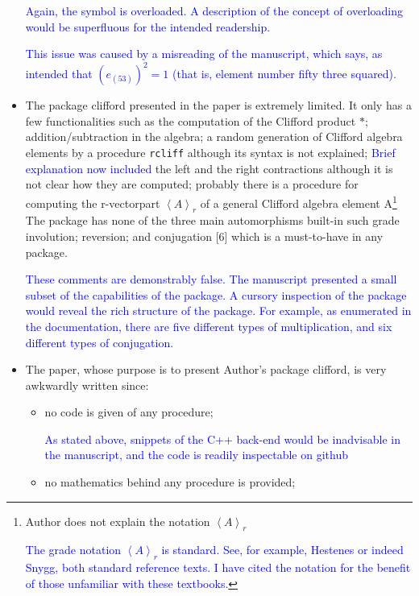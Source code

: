 \documentclass{article}
\begin{document}
\begin{itemize}
{\textcolor{blue}{Again, the {\tt *} symbol is overloaded.  A
  description of the concept of overloading would be superfluous for
  the intended readership.}  }

\textcolor{blue}{This issue was caused by a misreading of the
  manuscript, which says, as intended that $(e_{(53)})^2=1$ (that is,
  element number fifty three squared).}

\item The package clifford presented in the paper is extremely
  limited. It only has a few functionalities such as the computation
  of the Clifford product $*$; addition/subtraction in the algebra; a
  random generation of Clifford algebra elements by a procedure
  \verb+rcliff+ although its syntax is not explained;
  \textcolor{blue}{Brief explanation now included} the left and the
  right contractions although it is not clear how they are computed;
  probably there is a procedure for computing the r-vectorpart
  $\left\langle A\right\rangle_r$ of a general Clifford algebra
  element A\footnote{ Author does not explain the notation
  $\left\langle A\right\rangle_r$

  \textcolor{blue}{The grade notation $\left\langle A\right\rangle_r$
    is standard.  See, for example, Hestenes or indeed Snygg, both
    standard reference texts.  I have cited the notation for the
    benefit of those unfamiliar with these textbooks.}}
  The package
  has none of the three main automorphisms built-in such grade
  involution; reversion; and conjugation [6] which is a must-to-have
  in any package.

\textcolor{blue}{These comments are demonstrably false.  The
  manuscript presented a small subset of the capabilities of the
  package.  A cursory inspection of the package would reveal the rich
  structure of the package.  For example, as enumerated in the
  documentation, there are five different types of multiplication, and
  six different types of conjugation.}
  
\item The paper, whose purpose is to present Author’s package clifford, is very awkwardly written
since:

\begin{itemize}
\item no code is given of any procedure;

  \textcolor{blue}{As stated above, snippets of the C++ back-end would
    be inadvisable in the manuscript, and the code is readily
    inspectable on github}
\item  no mathematics behind any procedure is provided;


\end{itemize}
\end{itemize}
\end{document}
